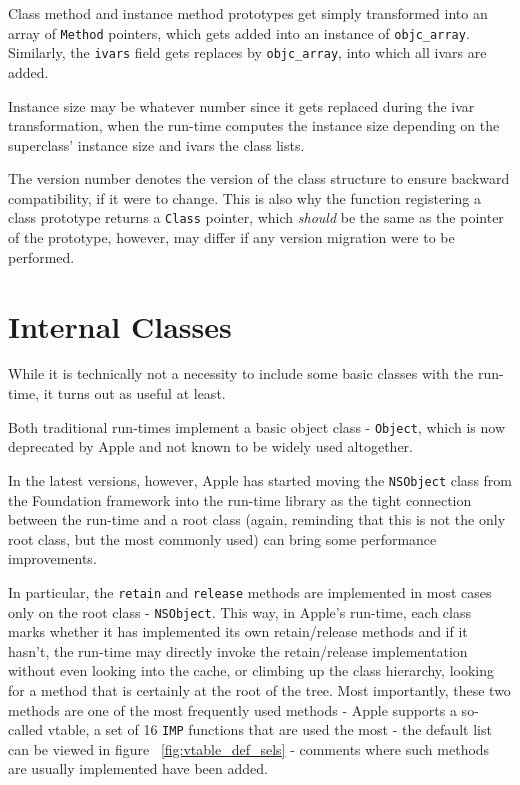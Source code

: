 Class method and instance method prototypes get simply transformed into an array of \verb=Method= pointers, which gets added into an instance of \verb=objc_array=. Similarly, the \verb=ivars= field gets replaces by \verb=objc_array=, into which all ivars are added.

Instance size may be whatever number since it gets replaced during the ivar transformation, when the run-time computes the instance size depending on the superclass' instance size and ivars the class lists.

The version number denotes the version of the class structure to ensure backward compatibility, if it were to change. This is also why the function registering a class prototype returns a \verb=Class= pointer, which \emph{should} be the same as the pointer of the prototype, however, may differ if any version migration were to be performed.

\section{Internal Classes}

While it is technically not a necessity to include some basic classes with the run-time, it turns out as useful at least.

Both traditional run-times implement a basic object class - \verb=Object=, which is now deprecated by Apple and not known to be widely used altogether.

In the latest versions, however, Apple has started moving the \verb=NSObject= class from the Foundation framework into the run-time library as the tight connection between the run-time and a root class (again, reminding that this is not the only root class, but the most commonly used) can bring some performance improvements.

In particular, the \verb=retain= and \verb=release= methods are implemented in most cases only on the root class - \verb=NSObject=. This way, in Apple's run-time, each class marks whether it has implemented its own retain/release methods and if it hasn't, the run-time may directly invoke the retain/release implementation without even looking into the cache, or climbing up the class hierarchy, looking for a method that is certainly at the root of the tree. Most importantly, these two methods are one of the most frequently used methods - Apple supports a so-called vtable, a set of 16 \verb=IMP= functions that are used the most - the default list can be viewed in figure ~\ref{fig:vtable_def_sels} - comments where such methods are usually implemented have been added.

